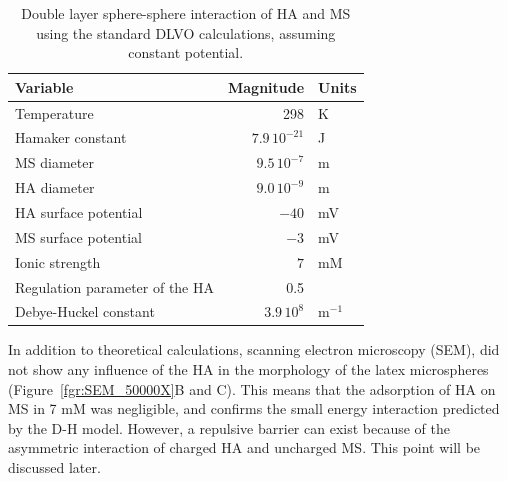 \documentclass[journal=langd5,manuscript=article]{achemso}
\begin{document}
\begin{table}
\caption{Double layer sphere-sphere interaction  of HA and MS using the standard DLVO calculations, assuming constant potential.}
\label{tbl:dvlo_interaction}
\begin{tabular}{lrl}
Variable & Magnitude & Units\\
\hline
Temperature & 298 & K\\
Hamaker constant & $7.9\,10^{-21}$ & J\cite{Fronczak2017}\\
MS  diameter & $9.5\, 10^{-7}$ & m\\
HA  diameter & $9.0\, 10^{-9}$ & m\\
HA surface potential & $-40$ & mV\cite{Rodrigues2009}\\
MS surface potential & $-3$ & mV\cite{Kotera1970}\\
Ionic strength & $7$ & mM \\
Regulation parameter of the HA & 0.5 \\
Debye-Huckel constant & $3.9\,10^8$ & $\mathrm{m^{-1}}$\\
\hline
\end{tabular}
\end{table}

In addition to theoretical calculations, scanning electron microscopy (SEM), did not show any influence of the HA in the morphology of the latex microspheres (Figure~\ref{fgr:SEM_50000X}B and C). This means that the adsorption of HA on MS in 7 mM  was negligible, and confirms the small energy interaction predicted by the D-H model. However, a repulsive barrier can exist because of the asymmetric interaction of charged HA and uncharged MS. This point will be discussed later.
\end{document}
